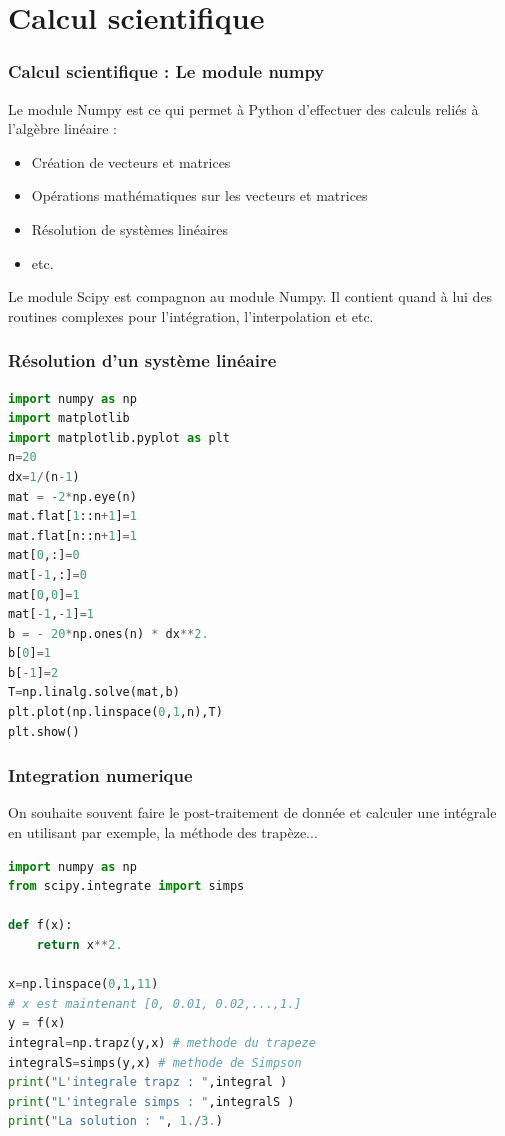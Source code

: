 \documentclass[]{beamer}
\begin{document}
\section{Calcul scientifique}

\begin{frame}
\frametitle{Calcul scientifique : Le module numpy}
Le module Numpy est ce qui permet à Python d'effectuer des calculs reliés à l'algèbre linéaire : 
\begin{itemize}
    \item Création de vecteurs et matrices
    \item Opérations mathématiques sur les vecteurs et matrices
    \item Résolution de systèmes linéaires
    \item etc.
\end{itemize}
Le module Scipy est compagnon au module Numpy. Il contient quand à lui des routines complexes pour l'intégration, l'interpolation et etc.

\end{frame}


\begin{frame}[fragile]
\frametitle{Résolution d'un système linéaire}
\begin{lstlisting}[language=Python]
import numpy as np
import matplotlib
import matplotlib.pyplot as plt
n=20
dx=1/(n-1)
mat = -2*np.eye(n)
mat.flat[1::n+1]=1
mat.flat[n::n+1]=1
mat[0,:]=0
mat[-1,:]=0
mat[0,0]=1
mat[-1,-1]=1
b = - 20*np.ones(n) * dx**2.
b[0]=1
b[-1]=2
T=np.linalg.solve(mat,b)
plt.plot(np.linspace(0,1,n),T)
plt.show()
\end{lstlisting}
\end{frame}


\begin{frame}[fragile]
\frametitle{Integration numerique }
On souhaite souvent faire le post-traitement de donnée et calculer une intégrale en utilisant par exemple, la méthode des trapèze...

\begin{lstlisting}[language=Python]
import numpy as np
from scipy.integrate import simps

def f(x):    
    return x**2.

x=np.linspace(0,1,11)
# x est maintenant [0, 0.01, 0.02,...,1.]
y = f(x)
integral=np.trapz(y,x) # methode du trapeze
integralS=simps(y,x) # methode de Simpson
print("L'integrale trapz : ",integral )
print("L'integrale simps : ",integralS )
print("La solution : ", 1./3.)

\end{lstlisting}
\end{frame}
\end{document}
